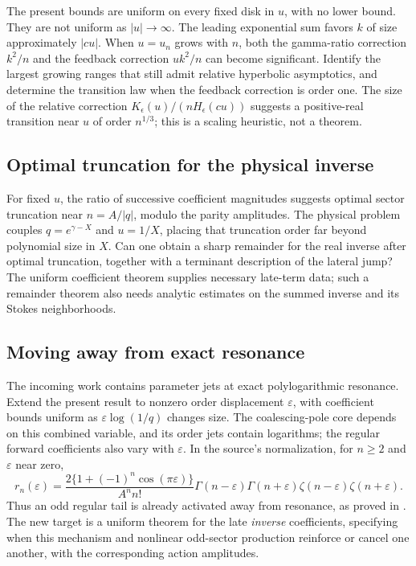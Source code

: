 The present bounds are uniform on every fixed disk in $u$, with no
lower bound. They are not uniform as $|u|\to\infty$.
The leading exponential sum favors $k$ of size approximately $|cu|$.
When $u=u_n$ grows with $n$, both the gamma-ratio correction
$k^2/n$ and the feedback correction $uk^2/n$ can become significant.
Identify the largest growing ranges that still admit relative
hyperbolic asymptotics, and determine the transition law when the
feedback correction is order one. The size of the relative correction
$K_\epsilon(u)/(nH_\epsilon(cu))$
suggests a positive-real transition near $u$ of order $n^{1/3}$;
this is a scaling heuristic, not a theorem.

\subsection{Optimal truncation for the physical inverse}

For fixed $u$, the ratio of successive coefficient magnitudes suggests
optimal sector truncation near $n=A/|q|$, modulo the parity amplitudes.
The physical problem couples $q=e^{\gamma-X}$ and $u=1/X$, placing
that truncation order far beyond polynomial size in $X$.
Can one obtain a sharp remainder for the real inverse after optimal
truncation, together with a terminant description of the lateral jump?
The uniform coefficient theorem supplies necessary late-term data;
such a remainder theorem also needs analytic estimates on the summed
inverse and its Stokes neighborhoods.

\subsection{Moving away from exact resonance}

The incoming work contains parameter jets at exact polylogarithmic
resonance. Extend the present result to nonzero order displacement
$\varepsilon$, with coefficient bounds uniform as
$\varepsilon\log(1/q)$ changes size. The coalescing-pole core depends on
this combined variable, and its order jets contain logarithms; the
regular forward coefficients also vary with $\varepsilon$. In the
source's normalization, for $n\ge2$ and $\varepsilon$ near zero,
\[
 r_n(\varepsilon)=
 \frac{2\{1+(-1)^n\cos(\pi\varepsilon)\}}{A^n n!}
 \Gamma(n-\varepsilon)\Gamma(n+\varepsilon)
 \zeta(n-\varepsilon)\zeta(n+\varepsilon).
\]
Thus an odd regular tail is already activated away from resonance, as
proved in \cite{incoming}. The new target is a uniform theorem for the
late \emph{inverse} coefficients, specifying when this mechanism and
nonlinear odd-sector production reinforce or cancel one another, with
the corresponding action amplitudes.

